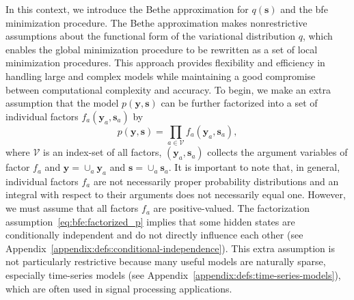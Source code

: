 In this context, we introduce the Bethe approximation for $q(\bm{s})$ and the \acf{bfe} minimization procedure.
The Bethe approximation makes nonrestrictive assumptions about the functional form of the
variational distribution $q$, which enables the global minimization procedure to be rewritten
as a set of local minimization procedures.
This approach provides flexibility and efficiency in handling large and complex models while
maintaining a good compromise between computational complexity and accuracy.
To begin, we make an extra assumption that the model $p(\bm{y}, \bm{s})$ can be further
factorized into a set of individual factors $f_a(\bm{y}_a, \bm{s}_a)$ by
\begin{equation}
    \label{eq:bfe:factorized_p} p(\bm{y}, \bm{s}) = \prod_{a\in\mathcal{V}}
    f_a(\bm{y}_a, \bm{s}_a),
  \end{equation} 
where $\mathcal{V}$ is an index-set of all factors,  $(\bm{y}_a, \bm{s}_a)$ collects the argument variables of factor $f_a$ and $\bm{y} = \cup_a \bm{y}_a$ and $\bm{s} = \cup_a \bm{s}_a$.
It is important to note that, in general, individual factors $f_a$ are not necessarily proper probability distributions and an integral with respect to their arguments does not necessarily equal one. 
However, we must assume that all factors $f_a$ are positive-valued.
The factorization assumption~\eqref{eq:bfe:factorized_p} implies that some hidden states are conditionally independent and do not directly influence each other (see Appendix~\ref{appendix:defs:conditional-independence}).
This extra assumption is not particularly restrictive because many useful models are naturally
sparse, especially time-series models (see Appendix~\ref{appendix:defs:time-series-models}), which are often used in signal processing applications.


